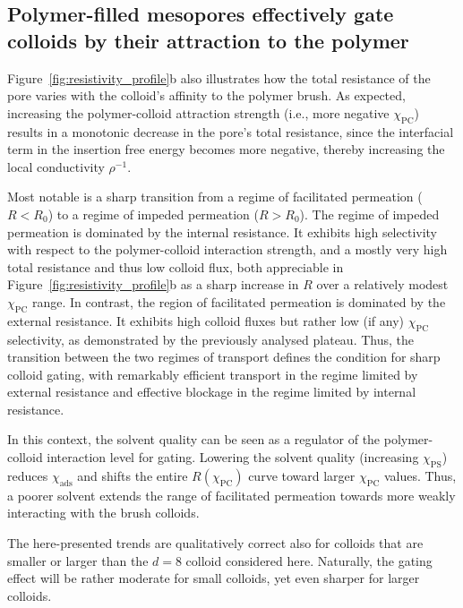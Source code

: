 \documentclass[12pt, a4paper]{article}
\begin{document}
\subsection{Polymer-filled mesopores effectively gate colloids by their attraction to the polymer}

Figure~\ref{fig:resistivity_profile}b also illustrates how the total resistance of the pore varies with the colloid's affinity to the polymer brush.
As expected, increasing the polymer-colloid attraction strength (i.e., more negative $\chi_{\text{PC}}$) results in a monotonic decrease in the pore's total resistance, since the interfacial term in the insertion free energy becomes more negative, thereby increasing the local conductivity $\rho^{-1}$.

Most notable is a sharp transition from a regime of facilitated permeation ($R < R_0$) to a regime of impeded permeation ($R > R_0$).
The regime of impeded permeation is dominated by the internal resistance.
It exhibits high selectivity with respect to the polymer-colloid interaction strength, and a mostly very high total resistance and thus low colloid flux, both appreciable in Figure~\ref{fig:resistivity_profile}b as a sharp increase in $R$ over a relatively modest $\chi_{\text{PC}}$ range.
In contrast, the region of facilitated permeation is dominated by the external resistance. 
It exhibits high colloid fluxes but rather low (if any) $\chi_{\text{PC}}$ selectivity, as demonstrated by the previously analysed plateau.
Thus, the transition between the two regimes of transport defines the condition for sharp colloid gating, with remarkably efficient transport in the regime limited by external resistance and effective blockage in the regime limited by internal resistance.

In this context, the solvent quality can be seen as a regulator of the polymer-colloid interaction level for gating. 
Lowering the solvent quality (increasing $\chi_{\text{PS}}$) reduces $\chi_{\text{ads}}$ and shifts the entire $R(\chi_{\text{PC}})$ curve toward larger $\chi_{\text{PC}}$ values.
Thus, a poorer solvent extends the range of facilitated permeation towards more weakly interacting with the brush colloids.

The here-presented trends are qualitatively correct also for colloids that are smaller or larger than the $d=8$ colloid considered here.
Naturally, the gating effect will be rather moderate for small colloids, yet even sharper for larger colloids.


\end{document}
